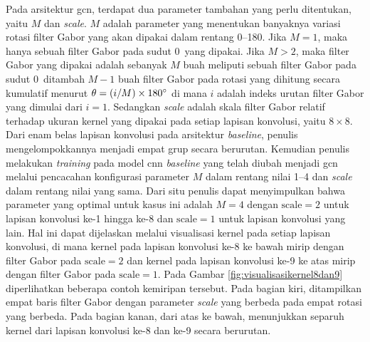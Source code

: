 Pada arsitektur \acrshort{gcn}, terdapat dua parameter tambahan yang perlu ditentukan, yaitu $M$ dan \textit{scale}. $M$ adalah parameter yang menentukan banyaknya variasi rotasi filter Gabor yang akan dipakai dalam rentang 0--180\degree. Jika $M = 1$, maka hanya sebuah filter Gabor pada sudut 0\degree\ yang dipakai. Jika $M > 2$, maka filter Gabor yang dipakai adalah sebanyak $M$ buah meliputi sebuah filter Gabor pada sudut 0\degree\ ditambah $M - 1$ buah filter Gabor pada rotasi yang dihitung secara kumulatif menurut $\theta = (i/M) \times 180\degree$ di mana $i$ adalah indeks urutan filter Gabor yang dimulai dari $i = 1$. Sedangkan \textit{scale} adalah skala filter Gabor relatif terhadap ukuran kernel yang dipakai pada setiap lapisan konvolusi, yaitu $8 \times 8$. Dari enam belas lapisan konvolusi pada arsitektur \textit{baseline}, penulis mengelompokkannya menjadi empat grup secara berurutan. Kemudian penulis melakukan \textit{training} pada model \acrshort{cnn} \textit{baseline} yang telah diubah menjadi \acrshort{gcn} melalui pencacahan konfigurasi parameter $M$ dalam rentang nilai 1--4 dan \textit{scale} dalam rentang nilai yang sama. Dari situ penulis dapat menyimpulkan bahwa parameter yang optimal untuk kasus ini adalah $M = 4$ dengan $\text{scale} = 2$ untuk lapisan konvolusi ke-1 hingga ke-8 dan $\text{scale} = 1$ untuk lapisan konvolusi yang lain. Hal ini dapat dijelaskan melalui visualisasi kernel pada setiap lapisan konvolusi, di mana kernel pada lapisan konvolusi ke-8 ke bawah mirip dengan filter Gabor pada $\text{scale} = 2$ dan kernel pada lapisan konvolusi ke-9 ke atas mirip dengan filter Gabor pada $\text{scale} = 1$. Pada Gambar \ref{fig:visualisasikernel8dan9} diperlihatkan beberapa contoh kemiripan tersebut. Pada bagian kiri, ditampilkan empat baris filter Gabor dengan parameter \textit{scale} yang berbeda pada empat rotasi yang berbeda. Pada bagian kanan, dari atas ke bawah, menunjukkan separuh kernel dari lapisan konvolusi ke-8 dan ke-9 secara berurutan.


